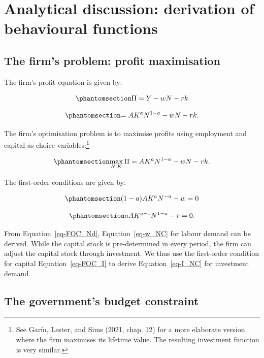 \documentclass[
  letterpaper,
  DIV=11,
  numbers=noendperiod]{scrreprt}
\begin{document}
\section{Analytical discussion: derivation of behavioural
functions}\label{analytical-discussion-derivation-of-behavioural-functions}

\subsection{The firm's problem: profit
maximisation}\label{the-firms-problem-profit-maximisation}

The firm's profit equation is given by:

\begin{equation}\phantomsection\label{eq-Pi}{
\Pi=Y-w N-r k
}\end{equation}

\begin{equation}\phantomsection\label{eq-Pi2}{
=A K^a N^{1-a}-w N-r k .
}\end{equation}

The firm's optimisation problem is to maximise profits using employment
and capital as choice variables:\footnote{See Garín, Lester, and Sims
  (2021, chap. 12) for a more elaborate version where the firm maximises
  its lifetime value. The resulting investment function is very similar.}

\begin{equation}\phantomsection\label{eq-Pi3}{
\max _{N, K} \Pi=A K^a N^{1-a}-w N-r k .
}\end{equation}

The first-order conditions are given by:

\begin{equation}\phantomsection\label{eq-FOC_Nd}{
(1-a) A K^a N^{-a}-w=0
}\end{equation}

\begin{equation}\phantomsection\label{eq-FOC_I}{
a A K^{a-1} N^{1-a}-r=0 .
}\end{equation}

From Equation~\ref{eq-FOC_Nd}, Equation~\ref{eq-w_NC} for labour demand
can be derived. While the capital stock is pre-determined in every
period, the firm can adjust the capital stock through investment. We
thus use the first-order condition for capital Equation~\ref{eq-FOC_I}
to derive Equation~\ref{eq-I_NC} for investment demand.

\subsection{The government's budget
constraint}\label{the-governments-budget-constraint}
\end{document}
